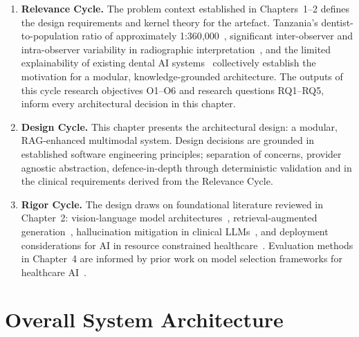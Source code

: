 \documentclass[12pt,a4paper]{report}
\begin{document}
	\begin{enumerate}
		
		\item \textbf{Relevance Cycle.} The problem context established in Chapters~1--2 defines
		the design requirements and kernel theory for the artefact. Tanzania's dentist-to-population
		ratio of approximately 1:360{,}000~\cite{Edward2024OralHealthTZ}, significant
		inter-observer and intra-observer variability in radiographic
		interpretation~\cite{hintze1998reliability_caries, pillai2022interobserver_demirjian,
			saunders2001radiographic_reliability}, and the limited explainability of existing dental
		AI systems~\cite{schwendicke2022ai_global, putra2021ai_dental_radiography,
			holzinger2017explainableai} collectively establish the motivation for a modular,
		knowledge-grounded architecture. The outputs of this cycle research objectives O1--O6
		and research questions RQ1--RQ5, inform every architectural decision in this chapter.
		
		\item \textbf{Design Cycle.} This chapter presents the architectural design: a modular,
		RAG-enhanced multimodal system. Design decisions are grounded in established software
		engineering principles; separation of concerns, provider agnostic abstraction,
		defence-in-depth through deterministic validation and in the clinical requirements
		derived from the Relevance Cycle.
		
		\item \textbf{Rigor Cycle.} The design draws on foundational literature reviewed in
		Chapter~2: vision-language model
		architectures~\cite{Li2023MultimodalFoundationModels, zhang2023biomedclip},
		retrieval-augmented generation~\cite{lewis2020retrieval, firoozi2025rag_dentistry},
		hallucination mitigation in clinical
		LLMs~\cite{ji2023survey, Wada2025RAGRadiology}, and deployment considerations for AI
		in resource constrained
		healthcare~\cite{Edward2024OralHealthTZ, tanzania_oral_health_policy}.
		Evaluation
		methods in Chapter~4 are informed by prior work on model selection frameworks for
		healthcare AI~\cite{schwendicke2022ai_global, schwendicke2021demystifying_ai}.
		
	\end{enumerate}
	
	\section{Overall System Architecture}
	\label{sec:architecture}
	
\end{document}
